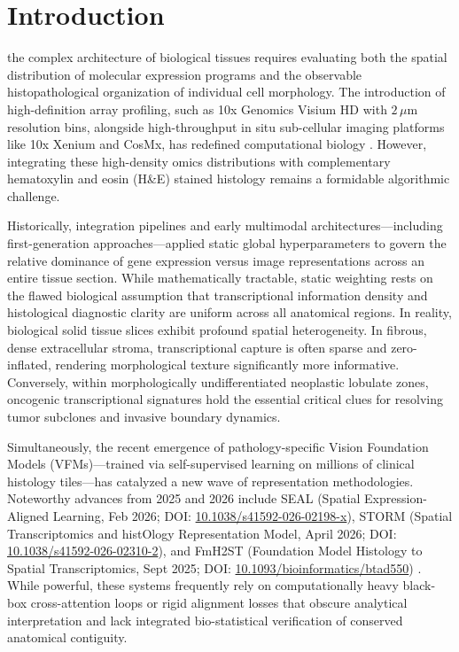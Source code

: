\documentclass[journal,10pt,twocolumn]{IEEEtran}
\begin{document}
\section{Introduction}
 the complex architecture of biological tissues requires evaluating both the spatial distribution of molecular expression programs and the observable histopathological organization of individual cell morphology. The introduction of high-definition array profiling, such as 10x Genomics Visium HD with $2\,\mu\text{m}$ resolution bins, alongside high-throughput in situ sub-cellular imaging platforms like 10x Xenium and CosMx, has redefined computational biology \cite{mosES2025, hdref2025}. However, integrating these high-density omics distributions with complementary hematoxylin and eosin (H\&E) stained histology remains a formidable algorithmic challenge.

Historically, integration pipelines and early multimodal architectures—including first-generation approaches—applied static global hyperparameters to govern the relative dominance of gene expression versus image representations across an entire tissue section. While mathematically tractable, static weighting rests on the flawed biological assumption that transcriptional information density and histological diagnostic clarity are uniform across all anatomical regions. In reality, biological solid tissue slices exhibit profound spatial heterogeneity. In fibrous, dense extracellular stroma, transcriptional capture is often sparse and zero-inflated, rendering morphological texture significantly more informative. Conversely, within morphologically undifferentiated neoplastic lobulate zones, oncogenic transcriptional signatures hold the essential critical clues for resolving tumor subclones and invasive boundary dynamics.

Simultaneously, the recent emergence of pathology-specific Vision Foundation Models (VFMs)—trained via self-supervised learning on millions of clinical histology tiles—has catalyzed a new wave of representation methodologies. Noteworthy advances from 2025 and 2026 include SEAL (Spatial Expression-Aligned Learning, Feb 2026; DOI: \href{https://doi.org/10.1038/s41592-026-02198-x}{10.1038/s41592-026-02198-x}), STORM (Spatial Transcriptomics and histOlogy Representation Model, April 2026; DOI: \href{https://doi.org/10.1038/s41592-026-02310-2}{10.1038/s41592-026-02310-2}), and FmH2ST (Foundation Model Histology to Spatial Transcriptomics, Sept 2025; DOI: \href{https://doi.org/10.1093/bioinformatics/btad550}{10.1093/bioinformatics/btad550}) \cite{seal2026, storm2026, fmh2st2025}. While powerful, these systems frequently rely on computationally heavy black-box cross-attention loops or rigid alignment losses that obscure analytical interpretation and lack integrated bio-statistical verification of conserved anatomical contiguity.
\end{document}

